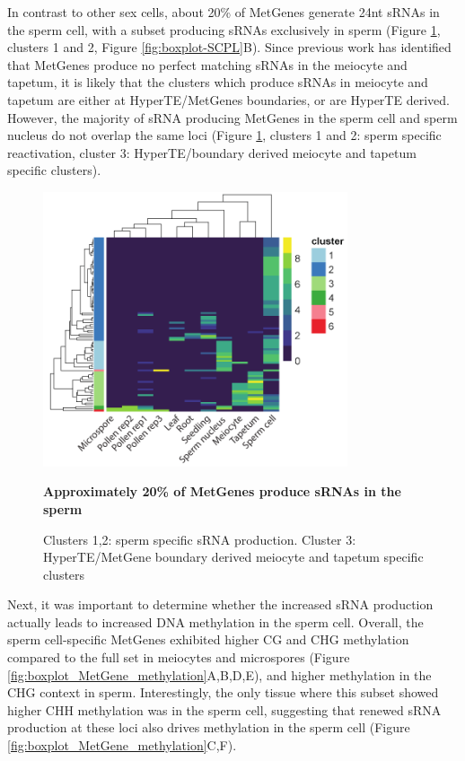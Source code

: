 In contrast to other sex cells, about 20\% of MetGenes generate 24nt sRNAs in the sperm cell, with a subset producing sRNAs exclusively in sperm (Figure \ref{fig:hm_metgene_reactivated}, clusters 1 and 2, Figure \ref{fig:boxplot-SCPL}B). Since previous work has identified that MetGenes produce no perfect matching sRNAs in the meiocyte and tapetum\citep{RN187}, it is likely that the clusters which produce sRNAs in meiocyte and tapetum are either at HyperTE/MetGenes boundaries, or are HyperTE derived. However, the majority of sRNA producing MetGenes in the sperm cell and sperm nucleus do not overlap the same loci (Figure \ref{fig:hm_metgene_reactivated}, clusters 1 and 2: sperm specific reactivation, cluster 3: HyperTE/boundary derived meiocyte and tapetum specific clusters).

\begin{figure}[htbp!] 
\centering
    \includegraphics[width=0.8\textwidth]{Chapter2/Figs/Figure11_Reactivated_MetGenes_heatmap.pdf}
\caption{\textbf{Approximately 20\% of MetGenes produce sRNAs in the sperm}}
\label{fig:hm_metgene_reactivated}
\captionsetup{font=small}
    \caption*{Clusters 1,2: sperm specific sRNA production. Cluster 3: HyperTE/MetGene boundary derived meiocyte and tapetum specific clusters}
\end{figure}

Next, it was important to determine whether the increased sRNA production actually leads to increased DNA methylation in the sperm cell. Overall, the sperm cell-specific MetGenes exhibited higher CG and CHG methylation compared to the full set in meiocytes and microspores (Figure \ref{fig:boxplot_MetGene_methylation}A,B,D,E), and higher methylation in the CHG context in sperm. Interestingly, the only tissue where this subset showed higher CHH methylation was in the sperm cell, suggesting that renewed sRNA production at these loci also drives methylation in the sperm cell (Figure \ref{fig:boxplot_MetGene_methylation}C,F).

